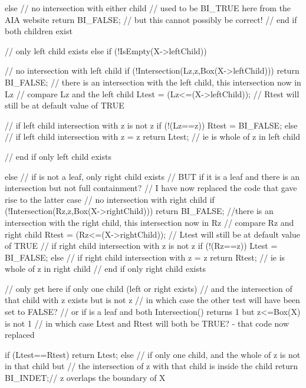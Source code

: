 \begin{DoxyCode}
{{    else            // no intersection with either child
                    // used to be BI_TRUE here from the AIA website
        return BI_FALSE;
    // but this cannot possibly be correct!
  }                 // end if both children exist

                    // only left child exists
  else if (!IsEmpty(X->leftChild))
  {
                    // no intersection with left child
    if (!Intersection(Lz,z,Box(X->leftChild)))
      return BI_FALSE;
    // there is an intersection with the left child, this intersection now in
       Lz
                    // compare Lz and the left child
    Ltest = (Lz<=(X->leftChild));
    // Rtest will still be at default value of TRUE

                    // if left child intersection with z is not z
    if (!(Lz==z)) Rtest = BI_FALSE;
    else            // if left child intersection with z = z
      return Ltest; // ie is whole of z in left child
  }                 // end if  only left child exists

  else              // if is not a leaf, only right child exists
  // BUT if it is a leaf and there is an intersection but not full containment?
  // I have now replaced the code that gave rise to the latter case
  {
                    // no intersection with right child
    if (!Intersection(Rz,z,Box(X->rightChild)))
      return BI_FALSE;
    //there is an intersection with the right child, this intersection now in
       Rz
                    // compare Rz and right child
    Rtest = (Rz<=(X->rightChild));
    // Ltest will still be at default value of TRUE
                    // if right child intersection with z is not z
    if (!(Rz==z)) Ltest = BI_FALSE;
    else            // if right child intersection with z = z
      return Rtest; // ie is whole of z in right child
  }                 // end if only right child exists

  // only get here if only one child (left or right exists)
  // and the intersection of that child with z exists but is not z
  // in which case the other test will have been set to FALSE?
  // or if is a leaf and both Intersection() returns 1 but z<=Box(X) is not 1
  // in which case Ltest and Rtest will both be TRUE? - that code now replaced

  if (Ltest==Rtest)
    return Ltest;
  else
    // if only one child, and the whole of z is not in that child but
    // the intersection of z with that child is inside the child
    return BI_INDET;// z overlaps the boundary of X
}
\end{DoxyCode}
